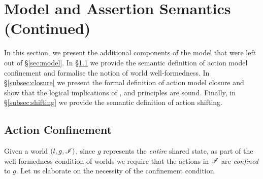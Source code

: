 \section{\colosl Model and Assertion Semantics (Continued)}\label{sec:model-continued}
In this section, we present the additional components of the \colosl model that were left out of \S\ref{sec:model}. In \S\ref{subsec:confinement} we provide the semantic definition of action model confinement and formalise the notion of world well-formedness. In \S\ref{subsec:closure} we present the formal definition of action model closure and show that the logical implications of \copyRule, \forgetRule and \mergeRule principles are sound. Finally, in \S\ref{subsec:shifting} we provide the semantic definition of action shifting. 
%
%
\subsection{Action Confinement}\label{subsec:confinement}
Given a world $(l, g, \mathscr{I})$, since $g$ represents the \emph{entire} shared state, as part of the well-formedness condition of worlds we require that the actions in $\mathscr{I}$ are \emph{confined} to $g$.  
Let us elaborate on the necessity of the confinement condition.


